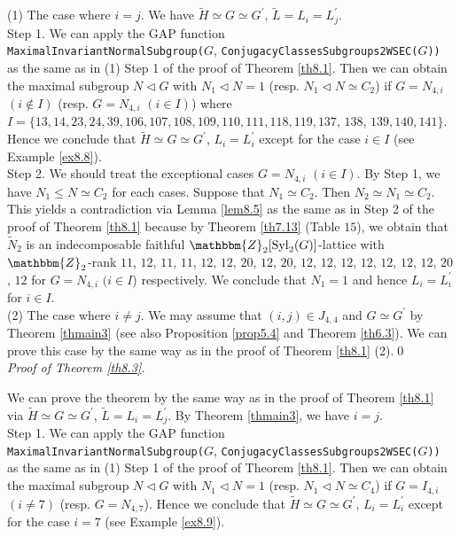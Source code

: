 \documentclass{amsart}
\theoremstyle{plain}
\theoremstyle{definition}
\theoremstyle{remark}
\newcommand{\bZ}{\mathbbm{Z}}\newcommand{\bQ}{\mathbbm{Q}}
\newcommand{\Syl}{{\rm Syl}}
\newcounter{sub}\def\tr{\mbox{tr }}
\begin{document}
{(1) The case where $i=j$. 
We have $\widetilde{H}\simeq G\simeq G^\prime$, 
$\widetilde{L}=L_i=L_j^\prime$.\\

Step 1. We can apply the GAP function\\ 
{\tt MaximalInvariantNormalSubgroup(}$G$,
{\tt ConjugacyClassesSubgroups2WSEC(}$G${\tt ))} 
as the same as in 
(1) Step 1 of the proof of Theorem \ref{th8.1}. 
Then we can obtain the maximal subgroup $N\lhd G$ with $N_1\lhd N=1$ 
(resp. $N_1\lhd N\simeq C_2$) 
if $G=N_{4,i}$ $(i\not\in I)$ (resp. $G=N_{4,i}$ $(i\in I)$) where 
$I=\{13, 14, 23, 24, 39, 106, 107, 108, 109, 110, 111, 118, 119, 137$, $138$, 
$139, 140, 141\}$. 
Hence we conclude that $\widetilde{H}\simeq G\simeq G^\prime$, 
$L_i=L^\prime_i$ except for the case $i\in I$ 
(see Example \ref{ex8.8}).\\

Step 2. We should treat the exceptional cases $G=N_{4,i}$ $(i\in I)$. 
By Step 1, we have $N_1\leq N\simeq C_2$ for each cases. 
Suppose that $N_1\simeq C_2$. 
Then $N_2\simeq N_1\simeq C_2$. 
This yields a contradiction via Lemma \ref{lem8.5} 
as the same as in Step 2 of the proof of Theorem \ref{th8.1} because 
by Theorem \ref{th7.13} (Table $15$), we obtain that 
$\widetilde{N}_2$ is an indecomposable faithful 
$\bZ_2[\Syl_2(G)]$-lattice with $\bZ_2$-rank 
$11$, $12$, $11$, $11$, $12$, $12$, $20$, $12$, $20$, $12$, $12$, 
$12$, $12$, $12$, $12$, $12$, $20$, $12$ 
for $G=N_{4,i}$ $(i\in I$) respectively. 
We conclude that $N_1=1$ and hence $L_i=L^\prime_i$ for $i\in I$.\\

(2) The case where $i\neq j$. 
We may assume that $(i,j)\in J_{4,4}$ and 
$G\simeq G^\prime$ by Theorem \ref{thmain3} 
(see also Proposition \ref{prop5.4} and Theorem \ref{th6.3}). 
We can prove this case by the same way as 
in the proof of Theorem \ref{th8.1} (2).\qed\\ 

{\it Proof of Theorem \ref{th8.3}.} 

We can prove the theorem by the same way as 
in the proof of Theorem \ref{th8.1} via 
$\widetilde{H}\simeq G\simeq G^\prime$, 
$\widetilde{L}=L_i=L_j^\prime$. 
By Theorem \ref{thmain3}, we have $i=j$.\\ 

Step 1. We can apply the GAP function\\ 
{\tt MaximalInvariantNormalSubgroup(}$G$,
{\tt ConjugacyClassesSubgroups2WSEC(}$G${\tt ))} 
as the same as in 
(1) Step 1 of the proof of Theorem \ref{th8.1}. 
Then we can obtain the maximal subgroup $N\lhd G$ with $N_1\lhd N=1$ 
(resp. $N_1\lhd N\simeq C_4$)  
if $G=I_{4,i}$ $(i\neq 7)$ (resp. $G=N_{4,7}$). 
Hence we conclude that $\widetilde{H}\simeq G\simeq G^\prime$, 
$L_i=L^\prime_i$ except for the case $i=7$ 
(see Example \ref{ex8.9}).\\

}
\end{document}
